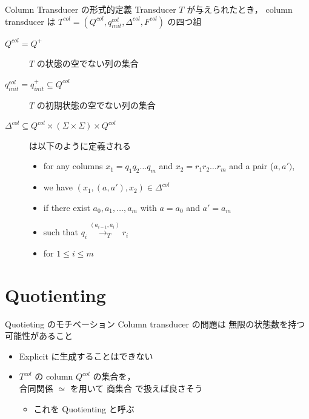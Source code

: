 \documentclass[presentation, xetex]{beamer}
\begin{document}
\begin{frame}[label={sec:org5da9821}]{Column Transducer の形式的定義}
Transducer \(T\) が与えられたとき，
column transducer は  \(T^{col} = (Q^{col}, q_{init}^{col}, \Delta^{col}, F^{col})\) の四つ組
\begin{description}
\item[{\(Q^{col} = Q^+\)}] \(T\) の状態の空でない列の集合
\item[{\(q_{init}^{col} = q_{init}^+ \subseteq Q^{col}\)}] \(T\) の初期状態の空でない列の集合
\item[{\(\Delta^{col} \subseteq Q^{col} \times (\Sigma \times \Sigma) \times Q^{col}\)}] は以下のように定義される
\begin{itemize}
\item for any columns \(x_1 = q_1 q_2 \dots q_m\) and \(x_2 = r_1 r_2 \dots r_m\) and a pair (\(a, a')\),
\item we have \((x_1, (a, a'), x_2) \in \Delta^{col}\)
\item if there exist \(a_0, a_1, \dots, a_m\) with \(a = a_0\) and \(a' = a_m\)
\item such that \(q_i \overset{(a_{i - 1}, a_i)}{\longrightarrow_T} r_i\)
\item for \(1 \leq i \leq m\)
\end{itemize}
\end{description}
\end{frame}


\section{Quotienting}
\label{sec:orge26d2d3}

\begin{frame}[label={sec:org5dcf3ef}]{Quotieting のモチベーション}
Column transducer の問題は \alert{\alert{無限の状態数を持つ}} 可能性があること
\begin{itemize}
\item Explicit に生成することはできない
\item \(T^{col}\) の column \(Q^{col}\) の集合を，\\
合同関係 \(\simeq\) を用いて \alert{\alert{商集合}} で扱えば良さそう
\begin{itemize}
\item これを \alert{\alert{Quotienting}} と呼ぶ
\end{itemize}
\end{itemize}
\end{frame}
\end{document}
